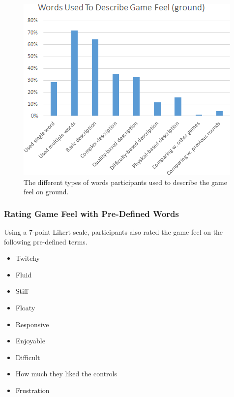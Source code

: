 \begin{figure}[htbp]
\centering
\includegraphics[width=0.8\columnwidth]{Pics/coding1}
\caption{The different types of words participants used to describe the game feel on ground.}
\label{fig:coding1}
\end{figure}



\subsubsection{Rating Game Feel with Pre-Defined Words}
Using a 7-point Likert scale, participants also rated the game feel on the following pre-defined terms.
\begin{itemize}[noitemsep,nolistsep]
\item Twitchy
\item Fluid
\item Stiff
\item Floaty
\item Responsive
\item Enjoyable
\item Difficult
\item How much they liked the controls
\item Frustration
\end{itemize}

